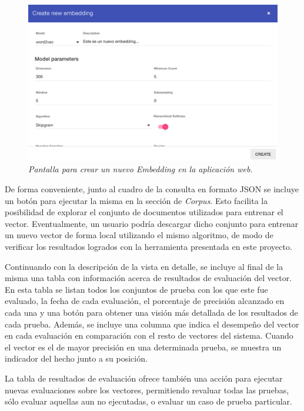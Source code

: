 \begin{figure}[h]
    \centering
    \includegraphics[width=\textwidth]{images/ui-nabu-embeddings-new}
    \caption{\textit{Pantalla para crear un nuevo Embedding en la aplicación web.}}
    \label{fig:ui-nabu-embeddings-new}
\end{figure}

De forma conveniente, junto al cuadro de la consulta en formato JSON se incluye un botón para ejecutar la
misma en la sección de \textit{Corpus}. Esto facilita la posibilidad de explorar el conjunto de documentos
utilizados para entrenar el vector. Eventualmente, un usuario podría descargar dicho conjunto para entrenar
un nuevo vector de forma local utilizando el mismo algoritmo, de modo de verificar los resultados logrados
con la herramienta presentada en este proyecto.

Continuando con la descripción de la vista en detalle, se incluye al final de la misma una tabla con
información acerca de resultados de evaluación del vector. En esta tabla se listan todos los conjuntos de
prueba con los que este fue evaluado, la fecha de cada evaluación, el porcentaje de precisión alcanzado en
cada una y una botón para obtener una visión más detallada de los resultados de cada prueba. Además, se
incluye una columna que indica el desempeño del vector en cada evaluación en comparación con el resto de
vectores del sistema. Cuando el vector es el de mayor precisión en una determinada prueba, se muestra un
indicador del hecho junto a su posición.

La tabla de resultados de evaluación ofrece también una acción para ejecutar nuevas evaluaciones sobre los
vectores, permitiendo revaluar todas las pruebas, sólo evaluar aquellas aun no ejecutadas, o evaluar un
caso de prueba particular.

